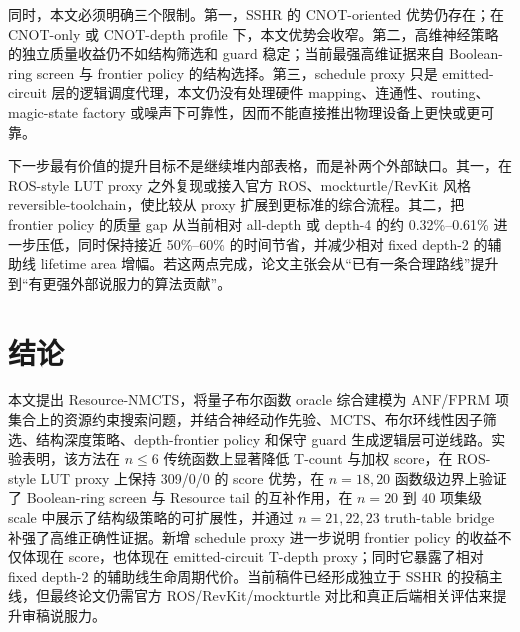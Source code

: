 \documentclass[UTF8,fontset=macnew,11pt]{ctexart}
\newcommand{\method}{Resource-NMCTS}
\newcommand{\screen}{Boolean-ring screen}
\newcommand{\anf}{\ensuremath{\mathrm{ANF}}}
\newcommand{\fprm}{\ensuremath{\mathrm{FPRM}}}
\newcommand{\mcts}{\ensuremath{\mathrm{MCTS}}}
\begin{document}
同时，本文必须明确三个限制。第一，SSHR 的 CNOT-oriented 优势仍存在；在 CNOT-only 或 CNOT-depth profile 下，本文优势会收窄。第二，高维神经策略的独立质量收益仍不如结构筛选和 guard 稳定；当前最强高维证据来自 Boolean-ring screen 与 frontier policy 的结构选择。第三，schedule proxy 只是 emitted-circuit 层的逻辑调度代理，本文仍没有处理硬件 mapping、连通性、routing、magic-state factory 或噪声下可靠性，因而不能直接推出物理设备上更快或更可靠。

下一步最有价值的提升目标不是继续堆内部表格，而是补两个外部缺口。其一，在 ROS-style LUT proxy 之外复现或接入官方 ROS、mockturtle/RevKit 风格 reversible-toolchain，使比较从 proxy 扩展到更标准的综合流程。其二，把 frontier policy 的质量 gap 从当前相对 all-depth 或 depth-4 的约 0.32\%--0.61\% 进一步压低，同时保持接近 50\%--60\% 的时间节省，并减少相对 fixed depth-2 的辅助线 lifetime area 增幅。若这两点完成，论文主张会从“已有一条合理路线”提升到“有更强外部说服力的算法贡献”。

\section{结论}

本文提出 \method{}，将量子布尔函数 oracle 综合建模为 \anf{}/\fprm{} 项集合上的资源约束搜索问题，并结合神经动作先验、\mcts{}、布尔环线性因子筛选、结构深度策略、depth-frontier policy 和保守 guard 生成逻辑层可逆线路。实验表明，该方法在 $n\leq6$ 传统函数上显著降低 T-count 与加权 score，在 ROS-style LUT proxy 上保持 309/0/0 的 score 优势，在 $n=18,20$ 函数级边界上验证了 \screen{} 与 Resource tail 的互补作用，在 $n=20$ 到 $40$ 项集级 scale 中展示了结构级策略的可扩展性，并通过 $n=21,22,23$ truth-table bridge 补强了高维正确性证据。新增 schedule proxy 进一步说明 frontier policy 的收益不仅体现在 score，也体现在 emitted-circuit T-depth proxy；同时它暴露了相对 fixed depth-2 的辅助线生命周期代价。当前稿件已经形成独立于 SSHR 的投稿主线，但最终论文仍需官方 ROS/RevKit/mockturtle 对比和真正后端相关评估来提升审稿说服力。
\end{document}
